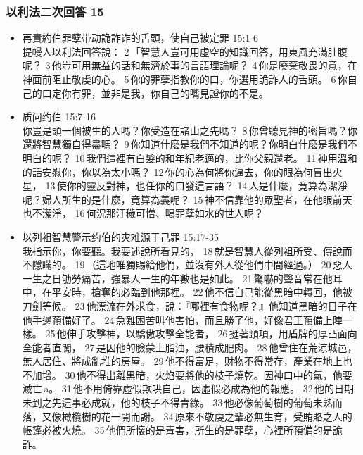 \subsubsection{以利法二次回答 15}
\begin{itemize}
\itemsep-.45em 
\item 再責約伯罪孽带动詭詐诈的舌頭，使自己被定罪 15:1-6\\
提幔人以利法回答說： 2 「智慧人豈可用虛空的知識回答，用東風充滿肚腹呢？ 3 他豈可用無益的話和無濟於事的言語理論呢？ 4 你是廢棄敬畏的意，在神面前阻止敬虔的心。 5 你的罪孽指教你的口，你選用詭詐人的舌頭。 6 你自己的口定你有罪，並非是我，你自己的嘴見證你的不是。
\item 质问约伯 15:7-16\\
你豈是頭一個被生的人嗎？你受造在諸山之先嗎？ 8 你曾聽見神的密旨嗎？你還將智慧獨自得盡嗎？ 9 你知道什麼是我們不知道的呢？你明白什麼是我們不明白的呢？ 10 我們這裡有白髮的和年紀老邁的，比你父親還老。 11 神用溫和的話安慰你，你以為太小嗎？ 12 你的心為何將你逼去，你的眼為何冒出火星， 13 使你的靈反對神，也任你的口發這言語？ 14 人是什麼，竟算為潔淨呢？婦人所生的是什麼，竟算為義呢？ 15 神不信靠他的眾聖者，在他眼前天也不潔淨， 16 何況那汙穢可憎、喝罪孽如水的世人呢？
\item 以列祖智慧警示约伯的灾难\underline{源于己罪} 15:17-35\\
我指示你，你要聽。我要述說所看見的， 18 就是智慧人從列祖所受、傳說而不隱瞞的。 19 （這地唯獨賜給他們，並沒有外人從他們中間經過。） 20 惡人一生之日劬勞痛苦，強暴人一生的年數也是如此。 21 驚嚇的聲音常在他耳中，在平安時，搶奪的必臨到他那裡。 22 他不信自己能從黑暗中轉回，他被刀劍等候。 23 他漂流在外求食，說：『哪裡有食物呢？』他知道黑暗的日子在他手邊預備好了。 24 急難困苦叫他害怕，而且勝了他，好像君王預備上陣一樣。 25 他伸手攻擊神，以驕傲攻擊全能者， 26 挺著頸項，用盾牌的厚凸面向全能者直闖， 27 是因他的臉蒙上脂油，腰積成肥肉。 28 他曾住在荒涼城邑，無人居住、將成亂堆的房屋。 29 他不得富足，財物不得常存，產業在地上也不加增。 30 他不得出離黑暗，火焰要將他的枝子燒乾。因神口中的氣，他要滅亡 a。 31 他不用倚靠虛假欺哄自己，因虛假必成為他的報應。 32 他的日期未到之先這事必成就，他的枝子不得青綠。 33 他必像葡萄樹的葡萄未熟而落，又像橄欖樹的花一開而謝。 34 原來不敬虔之輩必無生育，受賄賂之人的帳篷必被火燒。 35 他們所懷的是毒害，所生的是罪孽，心裡所預備的是詭詐。
\end{itemize}



